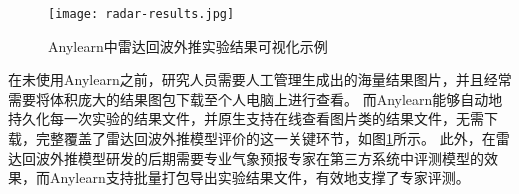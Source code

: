 \begin{figure}
  \centering
  \texttt{[image: radar-results.jpg]}
  \caption{Anylearn中雷达回波外推实验结果可视化示例}
  \label{fig:radarresults}
\end{figure}

在未使用Anylearn之前，研究人员需要人工管理生成出的海量结果图片，并且经常需要将体积庞大的结果图包下载至个人电脑上进行查看。
而Anylearn能够自动地持久化每一次实验的结果文件，并原生支持在线查看图片类的结果文件，无需下载，完整覆盖了雷达回波外推模型评价的这一关键环节，如图\ref{fig:radarresults}所示。
此外，在雷达回波外推模型研发的后期需要专业气象预报专家在第三方系统中评测模型的效果，而Anylearn支持批量打包导出实验结果文件，有效地支撑了专家评测。
